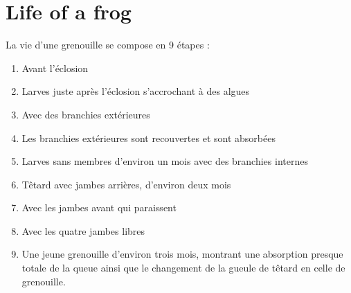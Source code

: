 \section{Life of a frog}
La vie d'une grenouille se compose en 9 étapes :
	\begin{enumerate}
	\item Avant l'éclosion
	\item Larves juste après l'éclosion s'accrochant à des algues
	\item Avec des branchies extérieures
	\item Les branchies extérieures sont recouvertes et sont absorbées
	\item Larves sans membres d'environ un mois avec des branchies internes
	\item Têtard avec jambes arrières, d'environ deux mois
	\item Avec les jambes avant qui paraissent
	\item Avec les quatre jambes libres
	\item Une jeune grenouille d'environ trois mois, montrant une absorption presque totale de la queue ainsi que le changement de la gueule de têtard en celle de grenouille.
	\end{enumerate}
	